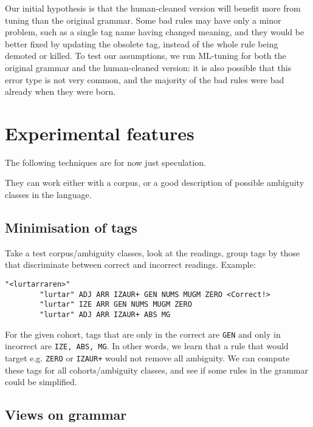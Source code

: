 \documentclass[11pt]{article}
\def\t#1{\texttt{#1}}
\begin{document}
Our initial hypothesis is that the human-cleaned version will benefit more 
from tuning than the original grammar. Some bad rules may have only a minor 
problem, such as a single tag name having changed meaning, and they would be 
better fixed by updating the obsolete tag, instead of the whole rule being 
demoted or killed. 
To test our assumptions, we run ML-tuning for both the original grammar and 
the human-cleaned version: it is also possible that this error type is not very 
common, and the majority of the bad rules were bad already when they were born.



\section{Experimental features}

The following techniques are for now just speculation.

They can work either with a corpus, or a good description of possible ambiguity classes in the language.

\subsection{Minimisation of tags}


Take a test corpus/ambiguity classes, look at the readings, 
group tags by those that discriminate between correct and incorrect readings.
Example:

\begin{verbatim}
"<lurtarraren>"
        "lurtar" ADJ ARR IZAUR+ GEN NUMS MUGM ZERO <Correct!>
        "lurtar" IZE ARR GEN NUMS MUGM ZERO 
        "lurtar" ADJ ARR IZAUR+ ABS MG
\end{verbatim}

For the given cohort, tags that are only in the correct are \t{GEN} and only in incorrect are \t{IZE, ABS, MG}.
In other words, we learn that a rule that would target e.g. \t{ZERO} or \t{IZAUR+} would not remove all ambiguity.
We can compute these tags for all cohorts/ambiguity classes, and see if some rules in the grammar could be simplified.


\subsection{Views on grammar}
\end{document}
